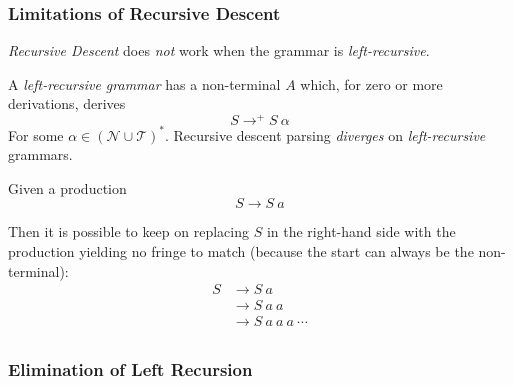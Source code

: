 \subsubsection{Limitations of Recursive Descent}

\textit{Recursive Descent} does \textit{not} work when the grammar is \textit{left-recursive}.

\begin{definition}
    A \textit{left-recursive grammar} has a non-terminal $A$ which, for zero or more derivations, derives
    \begin{equation}
        S \to^{+} S\ \alpha
    \end{equation}
    For some $\alpha \in (\mathcal{N} \cup \mathcal{T})^\ast$. Recursive descent parsing \textit{diverges} on \textit{left-recursive} grammars.
\end{definition}

\begin{example}
    Given a production
    \begin{equation}
        S \to S\ a
    \end{equation}
    
    Then it is possible to keep on replacing $S$ in the right-hand side with the production yielding no fringe to match (because the start can always be the non-terminal):
    \begin{align*}
        S &\to S\ a \\
        \phantom{} &\to S\ a\ a \\
        \phantom{} &\to S\ a\ a\ a\ \cdots \\
    \end{align*}
\end{example}

\subsubsection{Elimination of Left Recursion}

